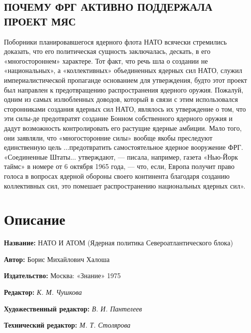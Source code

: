 \documentclass[12pt, a4paper, openany]{book}
\begin{document}
	\subsection[Почему ФРГ активно поддержала проект МЯС]{\center ПОЧЕМУ ФРГ АКТИВНО ПОДДЕРЖАЛА ПРОЕКТ МЯС}
	
	
	Поборники планировавшегося ядерного флота НАТО всячески стремились доказать, что его политическая сущность заключалась, дескать, в его «многостороннем» характере. Тот факт, что речь шла о создании не «национальных», а «коллективных» объединенных ядерных сил НАТО, служил империалистической пропаганде основанием для утверждения, будто этот проект был направлен к предотвращению распространения ядерного оружия. Пожалуй, одним из самых излюбленных доводов, который в связи с этим использовался сторонниками создания ядерных сил НАТО, являлось их утверждение о том, что эти силы-де предотвратят создание Бонном собственного ядерного оружия и дадут возможность контролировать его растущие ядерные амбиции. Мало того, они заявляли, что «многосторонние силы» вообще якобы преследуют единственную цель ...предотвратить самостоятельное ядерное вооружение ФРГ. «Соединенные Штаты... утверждают, — писала, например, газета «Нью-Йорк таймс» в номере от 6 октября 1965 года, — что, если, Европа получит право голоса в вопросах ядерной обороны своего континента благодаря созданию коллективных сил, это помешает распространению национальных ядерных сил».
	
	
	\newpage
	\tableofcontents
	
	\thispagestyle{empty} %
	
	\newpage
	
	\setcounter{secnumdepth}{0}
	
	
		\section*{Описание}
	
	{\bf Название:} НАТО И АТОМ (Ядерная политика Североатлантического блока) 
	
{\bf Автор:} Борис Михайлович Халоша
	
{\bf Издательство:} Москва: «Знание» 1975
	
		{\bf Редактор:} \textit{К. М. Чушкова}
	
		{\bf Художественный редактор:} \textit{В. И. Пантелеев}
	
		{\bf Технический редактор:} \textit{М. Т. Столярова}
	
\end{document}
